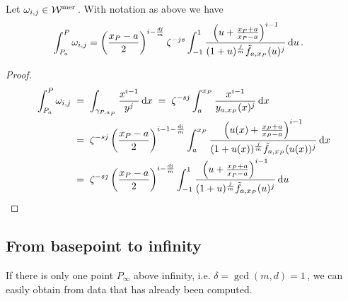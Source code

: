 \documentclass[main.tex]{subfiles}
\begin{document}
  
  \begin{thm}\label{thm:ajm_finite_int}
  Let $\omega_{i,j} \in \mathcal{W}^{\text{mer}}$\,. With notation as above we have
 \begin{align}\label{eq:aj_int}
  \begin{split}
       \int_{P_a}^P \omega_{i,j} & = \left(\frac{x_P-a}{2}\right)^{i-\frac{dj}{m}} \zeta^{-js} \int_{-1}^1 
      \frac{\left(u + \frac{x_P+a}{x_P-a}\right)^{i-1}}{(1+u)^{\frac{j}{m}} \tilde{f}_{a,x_P}(u)^j} \, \mathrm d u\,.
   \end{split}
   \end{align}
  \end{thm}
  \begin{proof}
    \begin{align}
    \begin{split}
     \int_{P_a}^P \omega_{i,j} \; & = \; \int_{\gamma_{P,a_P}} \frac{x^{i-1}}{y^j} \, \mathrm d x \; = \; \zeta^{-sj} \int_a^{x_P} \frac{x^{i-1}}{y_{a,x_P}(x)^j} \, \mathrm d x \\ \; & = \; 
     \zeta^{-sj} \left(\frac{x_P-a}{2}\right)^{i-1-\frac{dj}{m}}
     \int_a^{x_P} \frac{\left(u(x)+\frac{x_P+a}{x_P-a}\right)^{i-1}}{(1+u(x))^{\frac{j}{m}}\tilde{f}_{a,x_P}(u(x))^j} \, \mathrm d x \\
    \; & = \; \zeta^{-sj} \left(\frac{x_P-a}{2}\right)^{i-\frac{dj}{m}}
     \int_{-1}^{1} \frac{\left(u+\frac{x_P+a}{x_P-a}\right)^{i-1}}{(1+u)^{\frac{j}{m}}\tilde{f}_{a,x_P}(u)^j} \, \mathrm d u \\
    \end{split}
  \end{align}
  \end{proof}
  
  \subsection{From basepoint to infinity}\label{subsec:ajm_infty}    
      
    If there is only one point $P_{\infty}$ above infinity, i.e. $\delta = \gcd(m,d) = 1$\,, we can easily obtain from data that has already been computed.
    
\end{document}
